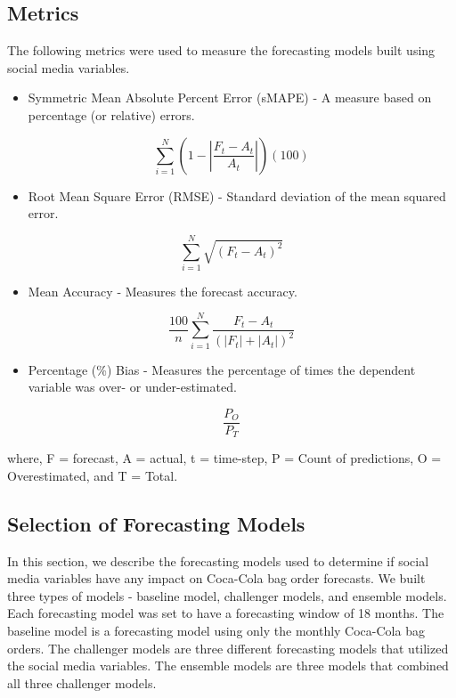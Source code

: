 \documentclass[12pt,oneside]{chicagocapstone}
\providecommand{\tightlist}{%
  \setlength{\itemsep}{0pt}\setlength{\parskip}{0pt}}
\begin{document}
\hypertarget{metrics}{%
\subsection*{Metrics}\label{metrics}}

The following metrics were used to measure the forecasting models built using social media variables.
\begin{itemize}
\tightlist
\item
  Symmetric Mean Absolute Percent Error (sMAPE) - A measure based on percentage (or relative) errors.
\end{itemize}
\noindent \[ \sum_{i=1}^N (1 - |\frac{F_t - A_t}{A_t}|)(100)\]
\begin{itemize}
\tightlist
\item
  Root Mean Square Error (RMSE) - Standard deviation of the mean squared error.
\end{itemize}
\noindent \[ \sum_{i=1}^N\sqrt{(F_t - A_t)^2} \]
\begin{itemize}
\tightlist
\item
  Mean Accuracy - Measures the forecast accuracy.
\end{itemize}
\noindent \[ \frac{100}{n}\sum_{i=1}^N\frac{F_t - A_t}{(|F_t| + |A_t|)^2}\]
\begin{itemize}
\tightlist
\item
  Percentage (\%) Bias - Measures the percentage of times the dependent variable was over- or under-estimated.
\end{itemize}
\noindent \[ \frac{ P_O}{P_T}\]

where,
F = forecast,
A = actual,
t = time-step,
P = Count of predictions,
O = Overestimated, and
T = Total.

\hypertarget{selection-of-forecasting-models}{%
\subsection*{Selection of Forecasting Models}\label{selection-of-forecasting-models}}

In this section, we describe the forecasting models used to determine if social media variables have any impact on Coca-Cola bag order forecasts. We built three types of models - baseline model, challenger models, and ensemble models. Each forecasting model was set to have a forecasting window of 18 months. The baseline model is a forecasting model using only the monthly Coca-Cola bag orders. The challenger models are three different forecasting models that utilized the social media variables. The ensemble models are three models that combined all three challenger models.
\end{document}
